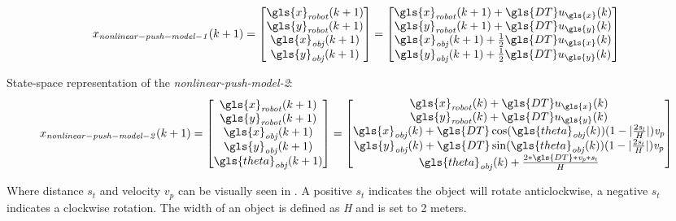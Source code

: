 \begin{equation}
x_{\mathit{nonlinear-push-model-1}}(k+1)=
\begin{bmatrix}
\gls{x}_{\mathit{robot}}(k+1)\\
\gls{y}_{\mathit{robot}}(k+1)\\
\gls{x}_{\mathit{obj}}(k+1)\\
\gls{y}_{\mathit{obj}}(k+1)
\end{bmatrix}
=
\begin{bmatrix}
\gls{x}_{\mathit{robot}}(k+1) + \gls{DT} u_{\gls{x}}(k)\\
\gls{y}_{\mathit{robot}}(k+1) + \gls{DT} u_{\gls{y}}(k)\\
\gls{x}_{\mathit{obj}}(k+1) + \frac{1}{2} \gls{DT} u_{\gls{x}}(k)\\
\gls{y}_{\mathit{obj}}(k+1) + \frac{1}{2} \gls{DT} u_{\gls{y}}(k)
\end{bmatrix}
\label{eq:nonlinear-push-model-1}
\end{equation}


State-space representation of the \textit{nonlinear-push-model-2}:\bs
\begin{equation}
x_{\mathit{nonlinear-push-model-2}}(k+1)=
\begin{bmatrix}
\gls{x}_{\mathit{robot}}(k+1)\\
\gls{y}_{\mathit{robot}}(k+1)\\
\gls{x}_{\mathit{obj}}(k+1)\\
\gls{y}_{\mathit{obj}}(k+1)\\
\gls{theta}_{\mathit{obj}}(k+1)
\end{bmatrix}
=
\begin{bmatrix}
\gls{x}_{\mathit{robot}}(k) + \gls{DT} u_{\gls{x}}(k)\\
\gls{y}_{\mathit{robot}}(k) + \gls{DT} u_{\gls{y}}(k)\\
\gls{x}_{\mathit{obj}}(k) + \gls{DT}\cos(\gls{theta}_{\mathit{obj}}(k)) (1-|\frac{2\mathit{s_t}}{H}|)\mathit{v_p}\\
\gls{y}_{\mathit{obj}}(k) + \gls{DT}\sin(\gls{theta}_{\mathit{obj}}(k)) (1-|\frac{2\mathit{s_t}}{H}|)\mathit{v_p}\\
\gls{theta}_{\mathit{obj}}(k) + \frac{2*\gls{DT}*\mathit{v_p}*\mathit{s_t}}{H}
\end{bmatrix}
\label{eq:nonlinear-push-model-2}
\end{equation}


Where distance $s_t$ and velocity $v_p$ can be visually seen in . A positive $s_t$ indicates the object will rotate anticlockwise, a negative $s_t$ indicates a clockwise rotation. The width of an object is defined as \textit{H} and is set to 2 meters.\bs

